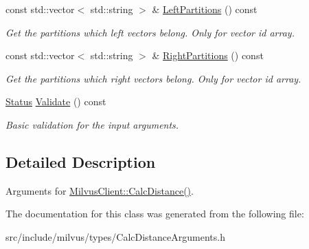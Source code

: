 \begin{DoxyCompactItemize}
\mbox{\label{classmilvus_1_1_calc_distance_arguments_a8683beee06c4482527d7ac824fb8fa33}} 
const std\+::vector$<$ std\+::string $>$ \& \hyperlink{classmilvus_1_1_calc_distance_arguments_a8683beee06c4482527d7ac824fb8fa33}{Left\+Partitions} () const
\begin{DoxyCompactList}\small\item\em Get the partitions which left vectors belong. Only for vector id array. \end{DoxyCompactList}\item 
\mbox{\label{classmilvus_1_1_calc_distance_arguments_a470efed41a86078bb67e664723200379}} 
const std\+::vector$<$ std\+::string $>$ \& \hyperlink{classmilvus_1_1_calc_distance_arguments_a470efed41a86078bb67e664723200379}{Right\+Partitions} () const
\begin{DoxyCompactList}\small\item\em Get the partitions which right vectors belong. Only for vector id array. \end{DoxyCompactList}\item 
\mbox{\label{classmilvus_1_1_calc_distance_arguments_afbdf8fc8ac08cbce2f7a37d4ac4ac251}} 
\hyperlink{classmilvus_1_1_status}{Status} \hyperlink{classmilvus_1_1_calc_distance_arguments_afbdf8fc8ac08cbce2f7a37d4ac4ac251}{Validate} () const
\begin{DoxyCompactList}\small\item\em Basic validation for the input arguments. \end{DoxyCompactList}\end{DoxyCompactItemize}


\subsection{Detailed Description}
Arguments for \hyperlink{classmilvus_1_1_milvus_client_a105c243c7d93ff2cd81b4d9c1751f5fb}{Milvus\+Client\+::\+Calc\+Distance()}. 

The documentation for this class was generated from the following file\+:\begin{DoxyCompactItemize}
\item 
src/include/milvus/types/Calc\+Distance\+Arguments.\+h\end{DoxyCompactItemize}

